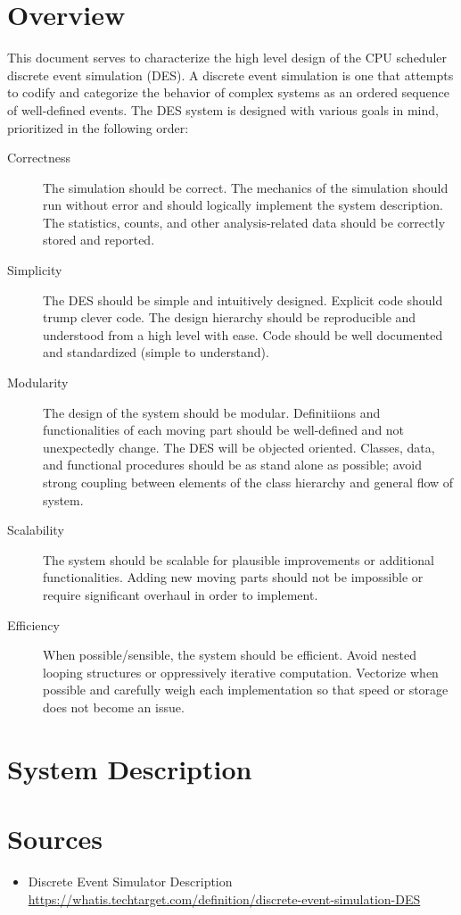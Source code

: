 \documentclass{article}
\begin{document}
\section*{Overview}
This document serves to characterize the high level design of the CPU scheduler discrete event simulation (DES). 
A discrete event simulation is one that attempts to codify and categorize the behavior of complex systems as an
ordered sequence of well-defined events.
The DES system is designed with various goals in mind, prioritized in the following order:
\begin{description}
    \item[Correctness]
        {The simulation should be correct.
         The mechanics of the simulation should run without error and should logically implement the system
         description.
         The statistics, counts, and other analysis-related data should be correctly stored and reported.
        }
    \item[Simplicity]
        {The DES should be simple and intuitively designed.
         Explicit code should trump clever code.
         The design hierarchy should be reproducible and understood from a high level with ease.
         Code should be well documented and standardized (simple to understand). 
        }
    \item[Modularity]
        {The design of the system should be modular. Definitiions and functionalities of each 
         moving part should be well-defined and not unexpectedly change. 
         The DES will be objected oriented.
         Classes, data, and functional procedures should be as stand alone as possible; avoid
         strong coupling between elements of the class hierarchy and general flow of system.
        }
    \item[Scalability]
        {The system should be scalable for plausible improvements or additional functionalities. 
         Adding new moving parts should not be impossible or require significant overhaul in order to implement. 
        }
    \item[Efficiency]
        {When possible/sensible, the system should be efficient. Avoid nested looping structures or oppressively
        iterative computation. Vectorize when possible and carefully weigh each implementation so that speed or
        storage does not become an issue.
        }
\end{description}
\section*{System Description}
\section*{Sources}
\begin{itemize}
    \item Discrete Event Simulator Description \\ 
        \href{https://whatis.techtarget.com/definition/discrete-event-simulation-DES}{https://whatis.techtarget.com/definition/discrete-event-simulation-DES}
\end{itemize}
\end{document}
